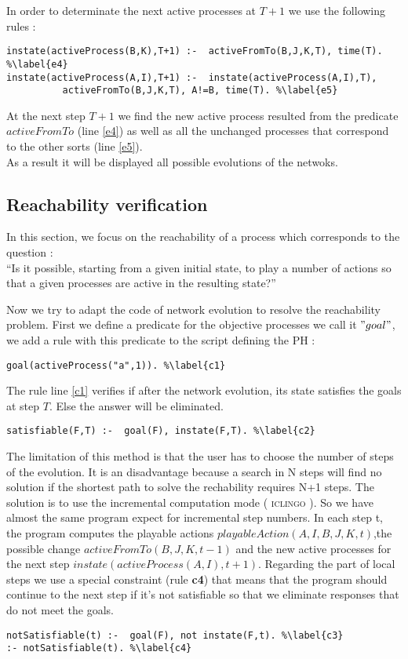 In order to determinate the next active processes at $T+1$ we use the following rules :
\begin{lstlisting}
instate(activeProcess(B,K),T+1) :-  activeFromTo(B,J,K,T), time(T). %\label{e4}
instate(activeProcess(A,I),T+1) :-  instate(activeProcess(A,I),T),
          activeFromTo(B,J,K,T), A!=B, time(T). %\label{e5}
\end{lstlisting}

At the next step $T+1$ we find the new active process resulted from the predicate $activeFromTo$ (line \ref{e4}) as well as all the unchanged processes that correspond to the other sorts (line \ref{e5}).\\
As a result it will be displayed all possible evolutions of the netwoks.
\subsection{Reachability verification}
In this section, we focus on the reachability of a process which corresponds to the question \cite{def:reachability} :\\
“Is it possible, starting from a given initial state, to play a number of actions so that a given processes are active in the resulting state?”

\noindent Now we try to adapt the code of network evolution to resolve the reachability problem. First we define a predicate for the objective processes we call it $"goal"$, we add a rule with this predicate to the script defining the PH :
\begin{lstlisting}
goal(activeProcess("a",1)). %\label{c1}
\end{lstlisting}
The rule line \ref{c1} verifies if after the network evolution, its state satisfies the goals at step $T$. Else the answer will be eliminated.
\begin{lstlisting}
satisfiable(F,T) :-  goal(F), instate(F,T). %\label{c2}
\end{lstlisting}
The limitation of this method is that the user has to choose the number of steps of the evolution. It is an disadvantage because a search in N steps will find no solution if the shortest path to solve the rechability requires N+1 steps. The solution is to use the incremental computation mode ( \textsc{iclingo} \cite{gebser2008user}).
So we have almost the same program expect for incremental step numbers. In each step t, the program computes the playable actions $playableAction(A,I,B,J,K,t)$,the possible change $activeFromTo(B,J,K,t-1)$ and the new active processes for the next step $instate(activeProcess(A,I),t+1)$. Regarding the part of local steps we use a special constraint (rule \textbf{c4}) that means that the program should continue to the next step if it's not satisfiable so that we eliminate responses that do not meet the goals.
\begin{lstlisting}
notSatisfiable(t) :-  goal(F), not instate(F,t). %\label{c3}
:- notSatisfiable(t). %\label{c4}
\end{lstlisting}
